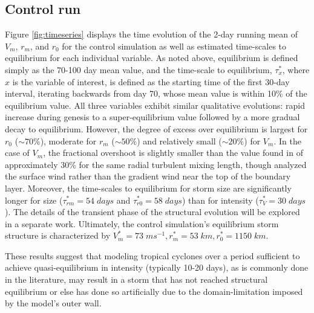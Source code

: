 \documentclass[12pt]{article}
\begin{document}
\subsection{Control run}
Figure \ref{fig:timeseries} displays the time evolution of the 2-day running mean of $V_m$, $r_m$, and $r_0$ for the control simulation as well as estimated time-scales to equilibrium for each individual variable.  As noted above, equilibrium is defined simply as the 70-100 day mean value, and the time-scale to equilibrium, $\tau^*_x$, where $x$ is the variable of interest, is defined as the starting time of the first 30-day interval, iterating backwards from day 70, whose mean value is within 10\% of the equilibrium value.  All three variables exhibit similar qualitative evolutions: rapid increase during genesis to a super-equilibrium value followed by a more gradual decay to equilibrium.  However, the degree of excess over equilibrium is largest for $r_0$ ($\sim 70\%$), moderate for $r_m$ ($\sim 50\%$) and relatively small ($\sim 20\%$) for $V_m$. In the case of $V_m$, the fractional overshoot is slightly smaller than the value found in \cite{Hakim_2011} of approximately 30\% for the same radial turbulent mixing length, though \cite{Hakim_2011} analyzed the surface wind rather than the gradient wind near the top of the boundary layer.  Moreover, the time-scales to equilibrium for storm size are significantly longer for size ($\tau^*_{rm} = 54 \; days$ and $\tau^*_{r0} = 58 \; days$) than for intensity ($\tau^*_V = 30 \; days$).  The details of the transient phase of the structural evolution will be explored in a separate work.  Ultimately, the control simulation's equilibrium storm structure is characterized by $V^*_m = 73 \; ms^{-1}, r^*_m = 53 \; km, r^*_0 = 1150 \; km$.

These results suggest that modeling tropical cyclones over a period sufficient to achieve quasi-equilibrium in intensity (typically 10-20 days), as is commonly done in the literature, may result in a storm that has not reached structural equilibrium or else has done so artificially due to the domain-limitation imposed by the model's outer wall.

\end{document}
